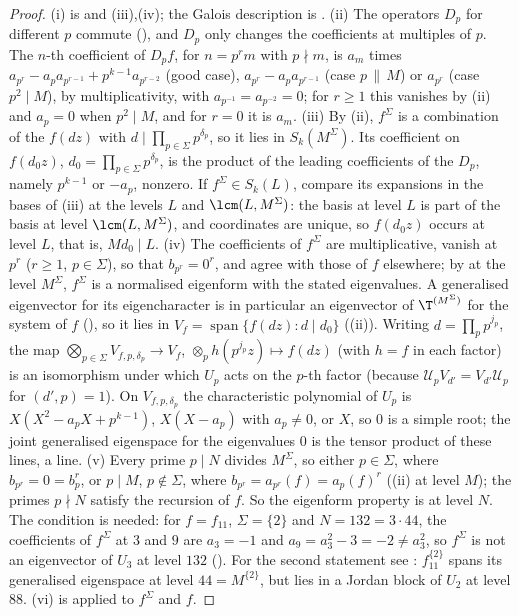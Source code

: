 \begin{proof}
(i) is  and (iii),(iv); the Galois description is . (ii) The operators $D_p$ for different $p$ commute
(), and $D_p$ only changes the coefficients at multiples of $p$. The $n$-th coefficient of $D_pf$, for $n=p^rm$ with $p\nmid m$, is $a_m$ times
$a_{p^r}-a_pa_{p^{r-1}}+p^{k-1}a_{p^{r-2}}$ (good case), $a_{p^r}-a_pa_{p^{r-1}}$ (case $p\,\|\,M$) or $a_{p^r}$ (case $p^2\mid M$), by multiplicativity, with $a_{p^{-1}}=a_{p^{-2}}=0$; for $r\ge1$ this vanishes by
(ii) and $a_p=0$ when $p^2\mid M$, and for $r=0$ it is $a_m$. (iii) By (ii), $f^\Sigma$ is a combination of the $f(dz)$ with $d\mid\prod_{p\in\Sigma}p^{\delta_p}$, so it lies in
$S_k(M^\Sigma)$. Its coefficient on $f(d_0z)$, $d_0=\prod_{p\in\Sigma}p^{\delta_p}$, is the product of the leading coefficients of the $D_p$, namely $p^{k-1}$ or $-a_p$, nonzero. If $f^\Sigma\in S_k(L)$,
compare its expansions in the bases of (iii) at the levels $L$ and $\lcm(L,M^\Sigma)$: the basis at level $L$ is part of the basis at level $\lcm(L,M^\Sigma)$, and
coordinates are unique, so $f(d_0z)$ occurs at level $L$, that is, $Md_0\mid L$. (iv) The coefficients of $f^\Sigma$ are multiplicative, vanish at $p^r$ ($r\ge1$, $p\in\Sigma$), so that $b_{p^r}=0^r$,
and agree with those of $f$ elsewhere; by  at the level $M^\Sigma$, $f^\Sigma$ is a normalised eigenform with the stated eigenvalues. A generalised
eigenvector for its eigencharacter is in particular an eigenvector of $\T^{(M^\Sigma)}$ for the system of $f$ (), so it lies in $V_f=\operatorname{span}\{f(dz):d\mid d_0\}$
((ii)). Writing $d=\prod_pp^{j_p}$, the map $\bigotimes_{p\in\Sigma}V_{f,p,\delta_p}\to V_f$, $\otimes_p h(p^{j_p}z)\mapsto f(dz)$ (with $h=f$ in each factor) is an isomorphism under which $U_p$
acts on the $p$-th factor (because $\mathcal U_pV_{d'}=V_{d'}\mathcal U_p$ for $(d',p)=1$). On $V_{f,p,\delta_p}$ the characteristic polynomial of $U_p$ is $X(X^2-a_pX+p^{k-1})$, $X(X-a_p)$ with $a_p\ne0$, or $X$,
so $0$ is a simple root; the joint generalised eigenspace for the eigenvalues $0$ is the tensor product of these lines, a line. (v) Every prime $p\mid N$ divides $M^\Sigma$, so either $p\in\Sigma$, where $b_{p^r}=0=b_p^r$, or $p\mid M$, $p\notin\Sigma$, where $b_{p^r}=a_{p^r}(f)=a_p(f)^r$ ((ii) at level $M$); the primes $p\nmid N$ satisfy the recursion of $f$. So the eigenform property is  at level $N$. The condition is needed: for $f=f_{11}$, $\Sigma=\{2\}$ and $N=132=3\cdot44$, the coefficients of $f^\Sigma$ at $3$ and $9$ are $a_3=-1$ and $a_9=a_3^2-3=-2\ne a_3^2$, so $f^\Sigma$ is not an eigenvector of $U_3$ at level $132$ (). For the second statement see : $f_{11}^{\{2\}}$ spans its generalised eigenspace at level $44=M^{\{2\}}$, but lies in a
Jordan block of $U_2$ at level $88$. (vi) is  applied to $f^\Sigma$ and $f$.
\end{proof}

